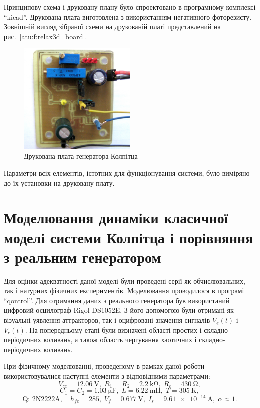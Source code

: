 Принципову схема і друковану плану було спроектовано в
програмному комплексі ``kicad''. Друкована плата виготовлена
з використанням негативного фоторезисту. Зовнішній
вигляд зібраної схеми на друкованій платі представлений
на рис.~\ref{atu:f:relax3d_board}.

\begin{figure}[htb!]
\centerline{\includegraphics[width=0.5\textwidth]{p/colp_board.jpg} }
\caption{Друкована плата генератора Колпітца}
\label{atu:f:colp_board}
\end{figure}

Параметри всіх елементів, істотних для функціонування системи,
було виміряно до їх установки на друковану плату.



\section{Моделювання динаміки класичної моделі системи Колпітца і порівняння з реальним генератором}%

Для оцінки адекватності даної моделі були проведені
серії як обчислювальних, так і натурних фізичних
експериментів.
Моделювання проводилося в програмі ``qontrol''.
Для отримання даних з реального генератора був використаний
цифровий осцилограф Rigol DS1052E. З його допомогою були отримані
як візуальні уявлення аттракторов, так і оцифровані значення
сигналів
$V_e (t) $ і
$V_c (t) $. На попередньому етапі були визначені області простих
і складно-періодичних коливань, а також область чергування
хаотичних і складно-періодичних коливань.

При фізичному моделюванні, проведеному в рамках даної
роботи використовувалися наступні елементи з відповідними
параметрами:
%
\[
  V_{cc} = \SI{12.06}{\volt},          \;
  R_1 = R_2 = \SI{2.2}{\kilo\ohm},     \;
  R_e = \SI{430}{\ohm},
\]
%
\[
  C_1 = C_2 = \SI{1.03}{\micro\farad}, \;
  L = \SI{6.22}{\milli\henry},         \;
  T = \SI{305}{\kelvin},
\]
%
\[
  \text{Q: 2N2222A}, \quad
  h_{fe}=285, \;
  V_f = \SI{0.677}{\volt}, \;
  I_s = \SI{9.61e-14}{\ampere}, \;
  \alpha \approx 1.
\]

